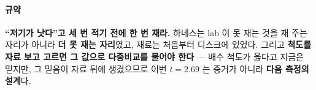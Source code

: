\documentclass[10pt]{article}
\begin{document}
\paragraph{규약} \textbf{``저기가 낫다''고 세 번 적기 전에 한 번 재라.}
하네스는 lab 이 못 재는 것을 재 주는 자리가 아니라 \textbf{더 못 재는
자리}였고, 재료는 처음부터 디스크에 있었다. 그리고 \textbf{척도를 자료 보고
고르면 그 값으로 다중비교를 물어야 한다} --- 배수 척도가 옳다고 지금은
믿지만, 그 믿음이 자료 뒤에 생겼으므로 이번 $t{=}2.69$ 는 증거가 아니라
\textbf{다음 측정의 설계}다.
\end{document}
